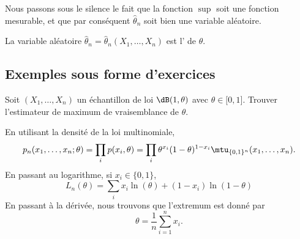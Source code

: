 \begin{remark}
    Nous passons sous le silence le fait que la fonction \( \sup\) soit une fonction mesurable, et que par conséquent \( \hat\theta_n\) soit bien une variable aléatoire.
\end{remark}

La variable aléatoire \( \hat\theta_n=\hat\theta_n(X_1,\ldots,X_n)\) est l' de \( \theta\).

\subsection{Exemples sous forme d'exercices}

\begin{example}
    Soit \( (X_1,\ldots,X_n)\) un échantillon de loi \( \dB(1,\theta)\) avec \( \theta\in\mathopen[ 0 , 1 \mathclose]\). Trouver l'estimateur de maximum de vraisemblance de \( \theta\).

    En utilisant la densité de la loi multinomiale,
    \begin{equation}
        p_n(x_1,\ldots,x_n;\theta)=\prod_ip(x_i,\theta)=\prod_i\theta^{x_i}(1-\theta)^{1-x_i}\mtu_{\{ 0,1 \}^n}(x_1,\ldots,x_n).
    \end{equation}
    En passant au logarithme, si \( x_i\in\{ 0,1 \}\),
    \begin{equation}
        L_n(\theta)=\sum_i x_i\ln(\theta)+(1-x_i)\ln(1-\theta)
    \end{equation}
    En passant à la dérivée, nous trouvons que l'extremum est donné par
    \begin{equation}
        \theta=\frac{1}{ n }\sum_{i=1}^nx_i.
    \end{equation}
\end{example}

